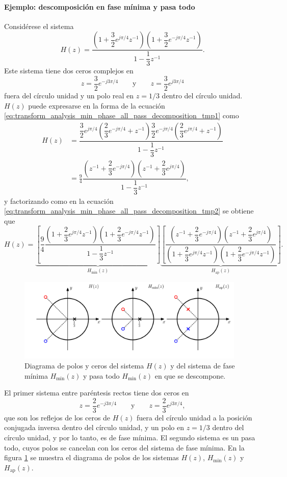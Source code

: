 \documentclass[a4paper]{report}
\begin{document}
\paragraph{Ejemplo: descomposición en fase mínima y pasa todo} Considérese el sistema
\[
 H(z)=\dfrac{\left(1+\dfrac{3}{2}e^{j\pi/4}z^{-1}\right)\left(1+\dfrac{3}{2}e^{-j\pi/4}z^{-1}\right)}{1-\dfrac{1}{3}z^{-1}}.
\]
Este sistema tiene dos ceros complejos en 
\[
 z=\frac{3}{2}e^{-j3\pi/4}
 \qquad\textrm{y}\qquad
 z=\frac{3}{2}e^{j3\pi/4}
\]
fuera del círculo unidad y un polo real en \(z=1/3\) dentro del círculo unidad. \(H(z)\) puede expresarse en la forma de la ecuación \ref{eq:transform_analysis_min_phase_all_pass_decomposition_tmp1} como
\begin{align*}
  H(z)&=\dfrac{\dfrac{3}{2}e^{j\pi/4}\left(\dfrac{2}{3}e^{-j\pi/4}+z^{-1}\right)\dfrac{3}{2}e^{-j\pi/4}\left(\dfrac{2}{3}e^{j\pi/4}+z^{-1}\right)}{1-\dfrac{1}{3}z^{-1}}\\
   &=\frac{9}{4}\dfrac{\left(z^{-1}+\dfrac{2}{3}e^{-j\pi/4}\right)\left(z^{-1}+\dfrac{2}{3}e^{j\pi/4}\right)}{1-\dfrac{1}{3}z^{-1}},
\end{align*}
y factorizando como en la ecuación \ref{eq:transform_analysis_min_phase_all_pass_decomposition_tmp2} se obtiene que 
\[
 H(z)=\underbrace{\left[\frac{9}{4}\dfrac{\left(1+\dfrac{2}{3}e^{j\pi/4}z^{-1}\right)\left(1+\dfrac{2}{3}e^{-j\pi/4}z^{-1}\right)}{1-\dfrac{1}{3}z^{-1}}\right]}_{\displaystyle H_\textrm{min}(z)}
 \underbrace{\left[\dfrac{\left(z^{-1}+\dfrac{2}{3}e^{-j\pi/4}\right)\left(z^{-1}+\dfrac{2}{3}e^{j\pi/4}\right)}{\left(1+\dfrac{2}{3}e^{j\pi/4}z^{-1}\right)\left(1+\dfrac{2}{3}e^{-j\pi/4}z^{-1}\right)}\right]}_{\displaystyle H_\textrm{ap}(z)}.
\]
\begin{figure}[!htb]
 \begin{center}
 \includegraphics[width=0.97\textwidth]{figuras/example_5_12_zero_pole_plot.pdf}
 \caption{\label{fig:example_5_12_zero_pole_plot} Diagrama de polos y ceros del sistema \(H(z)\) y del sistema de fase mínima \(H_\textrm{min}(z)\) y pasa todo \(H_\textrm{min}(z)\) en que se descompone.}
 \end{center}
\end{figure}
El primer sistema entre paréntesis rectos tiene dos ceros en
\[
 z=\frac{2}{3}e^{-j3\pi/4}
 \qquad\textrm{y}\qquad
 z=\frac{2}{3}e^{j3\pi/4},
\]
que son los reflejos de los ceros de \(H(z)\) fuera del círculo unidad a la posición conjugada inversa dentro del círculo unidad, y un polo en \(z=1/3\) dentro del círculo unidad, y por lo tanto, es de fase mínima. El segundo sistema es un pasa todo, cuyos polos se cancelan con los ceros del sistema de fase mínima. En la figura \ref{fig:example_5_12_zero_pole_plot} se muestra el diagrama de polos de los sistemas \(H(z)\), \(H_\textrm{min}(z)\) y \(H_\textrm{ap}(z)\).
\end{document}
